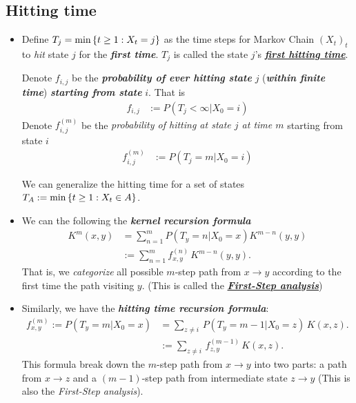 \documentclass[11pt]{article}
\begin{document}
\subsection{Hitting time}
\begin{itemize}
\item \begin{definition}
Define $T_{j} = \min\left\{t\ge 1: X_{t} = j\right\}$ as the time steps for Markov Chain $(X_t)_t$ to \emph{hit} state $j$ for the \emph{\textbf{first time}}. $T_j$ is called the state $j$'s \underline{\textbf{\emph{first hitting time}}}.


Denote $f_{i,j}$ be the \emph{\textbf{probability of ever hitting state}} $j$ (\emph{\textbf{within finite time}}) \emph{\textbf{starting from state}} $i$. That is
\begin{align}
f_{i,j} &:= P(T_{j} < \infty | X_{0} = i)\label{eqn: mc_hit_time_prob}
\end{align} Denote $f_{i,j}^{(m)}$ be the \emph{probability of hitting at state $j$ at time $m$} starting from state $i$
\begin{align}
f_{i,j}^{(m)} &:= P(T_{j} = m | X_{0} = i)\label{eqn: mc_hit_time_prob_m}
\end{align}

We can generalize the hitting time for a set of states $T_{A} := \min\left\{t\ge 1: X_{t} \in A\right\}$.
\end{definition}

\item We can the following the \emph{\textbf{kernel recursion formula}}
\begin{align}
K^{m}(x, y)&= \sum_{n=1}^{m} P(T_{y} = n | X_{0} = x)K^{m-n}(y, y) \label{eqn: mc_hitting_time_kernel}\\
&:= \sum_{n=1}^{m}f_{x,y}^{(n)}\,K^{m-n}(y, y). \nonumber 
\end{align} That is, we \emph{categorize} all possible $m$-step path from $x\rightarrow y$ according to the first time the path visiting $y$. (This is called the \underline{\emph{\textbf{First-Step analysis}}})

\item Similarly, we have the \textbf{\emph{hitting time recursion formula}}:
\begin{align}
f_{x,y}^{(m)} := P(T_{y} = m | X_{0} = x)&= \sum_{z \neq i}\,P(T_{y} = m - 1 | X_{0} = z)\,K(x, z) \label{eqn: mc_hitting_time_recursion}. \\
&:= \sum_{z \neq i}\,f_{z,y}^{(m-1)}\,K(x, z).\nonumber
\end{align} This formula break down the $m$-step path from $x\rightarrow y$ into two parts: a path from $x\rightarrow z$ and a $(m-1)$-step path from intermediate state $z\rightarrow y$ (This is also the \emph{First-Step analysis}).


\end{itemize}
\end{document}
